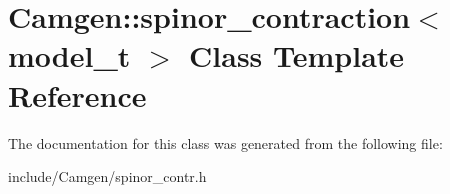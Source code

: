 \hypertarget{a00502}{\section{Camgen\-:\-:spinor\-\_\-contraction$<$ model\-\_\-t $>$ Class Template Reference}
\label{a00502}
}


The documentation for this class was generated from the following file\-:\begin{DoxyCompactItemize}
\item 
include/\-Camgen/spinor\-\_\-contr.\-h\end{DoxyCompactItemize}
